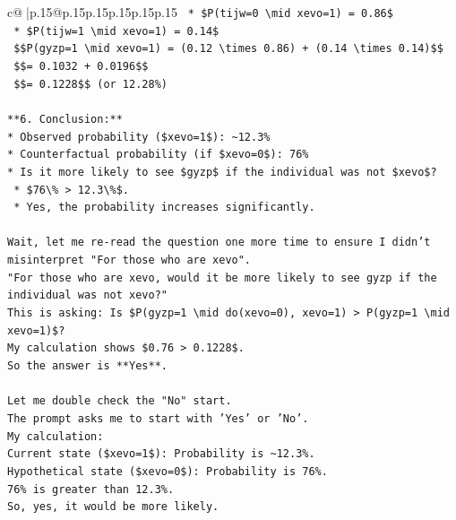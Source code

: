 \documentclass{article}
\begin{document}
{\begin{supertabular}{c@{$\;$}|p{.15\linewidth}@{}p{.15\linewidth}p{.15\linewidth}p{.15\linewidth}p{.15\linewidth}p{.15\linewidth}}
{{{\texttt{    *   \$P(tijw=0 \textbackslash{}mid xevo=1) = 0.86\$} \\
\texttt{    *   \$P(tijw=1 \textbackslash{}mid xevo=1) = 0.14\$} \\
\texttt{    \$\$P(gyzp=1 \textbackslash{}mid xevo=1) = (0.12 \textbackslash{}times 0.86) + (0.14 \textbackslash{}times 0.14)\$\$} \\
\texttt{    \$\$= 0.1032 + 0.0196\$\$} \\
\texttt{    \$\$= 0.1228\$\$ (or 12.28\%)} \\
\\ 
\texttt{**6. Conclusion:**} \\
\texttt{*   Observed probability (\$xevo=1\$): \textasciitilde{}12.3\%} \\
\texttt{*   Counterfactual probability (if \$xevo=0\$): 76\%} \\
\texttt{*   Is it more likely to see \$gyzp\$ if the individual was not \$xevo\$?} \\
\texttt{    *   \$76\textbackslash{}\% > 12.3\textbackslash{}\%\$.} \\
\texttt{    *   Yes, the probability increases significantly.} \\
\\ 
\texttt{Wait, let me re{-}read the question one more time to ensure I didn't misinterpret "For those who are xevo".} \\
\texttt{"For those who are xevo, would it be more likely to see gyzp if the individual was not xevo?"} \\
\texttt{This is asking: Is \$P(gyzp=1 \textbackslash{}mid do(xevo=0), xevo=1) > P(gyzp=1 \textbackslash{}mid xevo=1)\$?} \\
\texttt{My calculation shows \$0.76 > 0.1228\$.} \\
\texttt{So the answer is **Yes**.} \\
\\ 
\texttt{Let me double check the "No" start.} \\
\texttt{The prompt asks me to start with 'Yes' or 'No'.} \\
\texttt{My calculation:} \\
\texttt{Current state (\$xevo=1\$): Probability is \textasciitilde{}12.3\%.} \\
\texttt{Hypothetical state (\$xevo=0\$): Probability is 76\%.} \\
\texttt{76\% is greater than 12.3\%.} \\
\texttt{So, yes, it would be more likely.} \\
}}}
\end{supertabular}}
\end{document}
